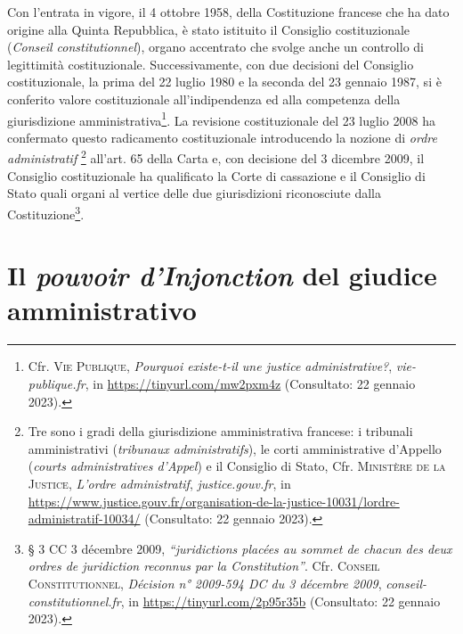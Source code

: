 \documentclass[12pt,it,a4paper,]{report}
\begin{document}
Con l'entrata in vigore, il 4 ottobre 1958, della Costituzione francese
che ha dato origine alla Quinta Repubblica, è stato istituito il
Consiglio costituzionale (\emph{Conseil constitutionnel}), organo
accentrato che svolge anche un controllo di legittimità costituzionale.
Successivamente, con due decisioni del Consiglio costituzionale, la
prima del 22 luglio 1980 e la seconda del 23 gennaio 1987, si è
conferito valore costituzionale all'indipendenza ed alla competenza
della giurisdizione amministrativa\footnote{Cfr. \textsc{Vie Publique},
  \emph{Pourquoi existe-t-il une justice administrative?},
  \emph{vie-publique.fr}, in \url{https://tinyurl.com/mw2pxm4z}
  (Consultato: 22 gennaio 2023).}. La revisione costituzionale del 23
luglio 2008 ha confermato questo radicamento costituzionale introducendo
la nozione di \emph{ordre administratif} \footnote{Tre sono i gradi
  della giurisdizione amministrativa francese: i tribunali
  amministrativi (\emph{tribunaux administratifs}), le corti
  amministrative d'Appello (\emph{courts administratives d'Appel}) e il
  Consiglio di Stato, Cfr. \textsc{Ministère de la Justice},
  \emph{L'ordre administratif}, \emph{justice.gouv.fr}, in
  \url{https://www.justice.gouv.fr/organisation-de-la-justice-10031/lordre-administratif-10034/}
  (Consultato: 22 gennaio 2023).} all'art. 65 della Carta e, con
decisione del 3 dicembre 2009, il Consiglio costituzionale ha
qualificato la Corte di cassazione e il Consiglio di Stato quali organi
al vertice delle due giurisdizioni riconosciute dalla
Costituzione\footnote{§ 3 CC 3 décembre 2009, \emph{``juridictions
  placées au sommet de chacun des deux ordres de juridiction reconnus
  par la Constitution''}. Cfr. \textsc{Conseil Constitutionnel},
  \emph{Décision n° 2009-594 DC du 3 décembre 2009},
  \emph{conseil-constitutionnel.fr}, in
  \url{https://tinyurl.com/2p95r35b} (Consultato: 22 gennaio 2023).}.

\hypertarget{il-pouvoir-dinjonction-del-giudice-amministrativo}{%
\section{\texorpdfstring{Il \emph{pouvoir d'Injonction} del giudice
amministrativo}{Il pouvoir d'Injonction del giudice amministrativo}}\label{il-pouvoir-dinjonction-del-giudice-amministrativo}}
\end{document}
